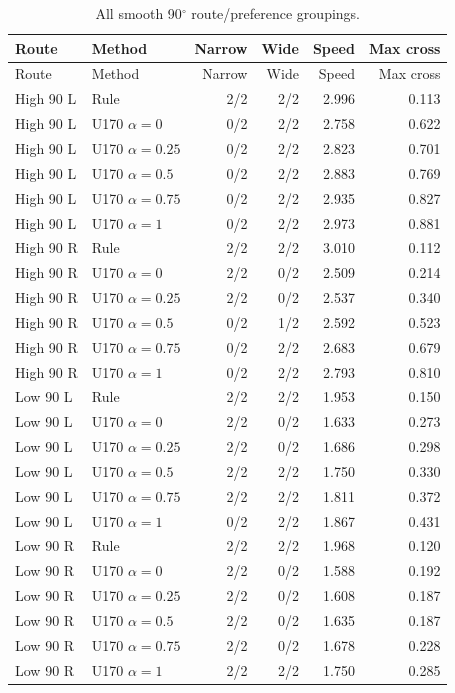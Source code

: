 \documentclass[11pt,a4paper]{article}
\begin{document}
\begin{longtable}{llrrrr}
\caption{All smooth 90$^\circ$ route/preference groupings.\label{tab:angle}}\\
\toprule
Route & Method & Narrow & Wide & Speed & Max cross \\
\midrule
\endfirsthead
\toprule
Route & Method & Narrow & Wide & Speed & Max cross \\
\midrule
\endhead
High 90 L & Rule & 2/2 & 2/2 & 2.996 & 0.113 \\
High 90 L & U170 $\alpha=0$ & 0/2 & 2/2 & 2.758 & 0.622 \\
High 90 L & U170 $\alpha=0.25$ & 0/2 & 2/2 & 2.823 & 0.701 \\
High 90 L & U170 $\alpha=0.5$ & 0/2 & 2/2 & 2.883 & 0.769 \\
High 90 L & U170 $\alpha=0.75$ & 0/2 & 2/2 & 2.935 & 0.827 \\
High 90 L & U170 $\alpha=1$ & 0/2 & 2/2 & 2.973 & 0.881 \\
High 90 R & Rule & 2/2 & 2/2 & 3.010 & 0.112 \\
High 90 R & U170 $\alpha=0$ & 2/2 & 0/2 & 2.509 & 0.214 \\
High 90 R & U170 $\alpha=0.25$ & 2/2 & 0/2 & 2.537 & 0.340 \\
High 90 R & U170 $\alpha=0.5$ & 0/2 & 1/2 & 2.592 & 0.523 \\
High 90 R & U170 $\alpha=0.75$ & 0/2 & 2/2 & 2.683 & 0.679 \\
High 90 R & U170 $\alpha=1$ & 0/2 & 2/2 & 2.793 & 0.810 \\
Low 90 L & Rule & 2/2 & 2/2 & 1.953 & 0.150 \\
Low 90 L & U170 $\alpha=0$ & 2/2 & 0/2 & 1.633 & 0.273 \\
Low 90 L & U170 $\alpha=0.25$ & 2/2 & 0/2 & 1.686 & 0.298 \\
Low 90 L & U170 $\alpha=0.5$ & 2/2 & 2/2 & 1.750 & 0.330 \\
Low 90 L & U170 $\alpha=0.75$ & 2/2 & 2/2 & 1.811 & 0.372 \\
Low 90 L & U170 $\alpha=1$ & 0/2 & 2/2 & 1.867 & 0.431 \\
Low 90 R & Rule & 2/2 & 2/2 & 1.968 & 0.120 \\
Low 90 R & U170 $\alpha=0$ & 2/2 & 0/2 & 1.588 & 0.192 \\
Low 90 R & U170 $\alpha=0.25$ & 2/2 & 0/2 & 1.608 & 0.187 \\
Low 90 R & U170 $\alpha=0.5$ & 2/2 & 0/2 & 1.635 & 0.187 \\
Low 90 R & U170 $\alpha=0.75$ & 2/2 & 0/2 & 1.678 & 0.228 \\
Low 90 R & U170 $\alpha=1$ & 2/2 & 2/2 & 1.750 & 0.285 \\
\bottomrule
\end{longtable}
\end{document}
